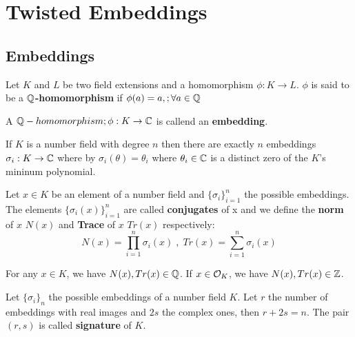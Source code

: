 \documentclass[Ingles]{ic-tese-v3}
\begin{document}
\section{Twisted Embeddings}
\label{sec:orgb319ea8}
\subsection{Embeddings}
\label{sec:orgbe8abdc}

\begin{definition}
Let $K$ and $L$ be two field extensions and a homomorphism $\phi: K \rightarrow L$. $\phi$ is said to be a \textbf{$\mathbb{Q}$-homomorphism} if $\phi(a) = a, ; \forall a \in \mathbb{Q}$ 
\end{definition}

\begin{definition}
A $\mathbb{Q}-homomorphism ; \phi: K \rightarrow \mathbb{C}$ is callend an \textbf{embedding}.
\end{definition}

\begin{theorem}
 If $K$ is a number field with degree $n$ then there are
exactly $n$ embeddings $\sigma_i : K \rightarrow \mathbb{C}$ where by $\sigma_i(\theta) =
\theta_i$ where $\theta_i \in \mathbb{C}$ is a distinct zero of the $K$'s
mininum polynomial.
\end{theorem}

      \begin{definition}
  \label{def:trace-and-norm}
  Let $x \in K$ be an element of a number field and $\{\sigma_i\}_{i=1}^n$ the possible
  embeddings. The elements $\{\sigma_i(x)\}_{i=1}^n$ are called \textbf{conjugates} of
  x and we define the \textbf{norm} of $x$ $N(x)$ and \textbf{Trace} of $x$ $Tr(x)$
  respectively:
  $$
  N(x) = \prod_{i=1}^n{\sigma_i(x)} \;,\;   Tr(x) = \sum_{i=1}^n{\sigma_i(x)}
  $$

\end{definition}
\begin{theorem}[] 
  For any $x \in K$, we have $N(x), Tr(x) \in \mathbb{Q}$. If $x \in \mathcal{O}_K$, we have $N(x),
  Tr(x) \in \mathbb{Z}$.
\end{theorem}


   \begin{definition}
Let $\{\sigma_i\}_n$ the possible embeddings of a number field $K$. Let $r$ the number of embeddings with real images and $2s$ the complex ones, then
$r + 2s = n$. The pair $\left(r,s\right)$ is called \textbf{signature} of $K$.
\end{definition}
\end{document}
